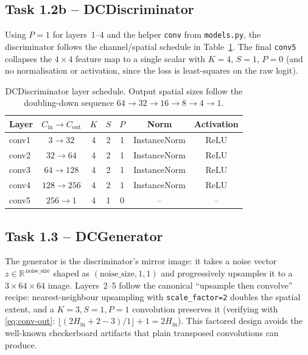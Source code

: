 \documentclass[11pt,a4paper]{article}
\begin{document}
\subsection*{Task 1.2b -- DCDiscriminator}

Using $P=1$ for layers~1--4 and the helper \texttt{conv} from
\texttt{models.py}, the discriminator follows the channel/spatial schedule
in Table~\ref{tab:disc}. The final \texttt{conv5} collapses the
$4{\times}4$ feature map to a single scalar with $K=4,\,S=1,\,P=0$ (and
no normalisation or activation, since the loss is least-squares on the
raw logit).

\begin{table}[h]
    \centering
    \begin{tabular}{lcccccc}
        \toprule
        Layer & $C_{\text{in}}\!\to\!C_{\text{out}}$ & $K$ & $S$ & $P$ & Norm & Activation \\
        \midrule
        conv1 & $3 \to 32$    & 4 & 2 & 1 & InstanceNorm & ReLU \\
        conv2 & $32 \to 64$   & 4 & 2 & 1 & InstanceNorm & ReLU \\
        conv3 & $64 \to 128$  & 4 & 2 & 1 & InstanceNorm & ReLU \\
        conv4 & $128 \to 256$ & 4 & 2 & 1 & InstanceNorm & ReLU \\
        conv5 & $256 \to 1$   & 4 & 1 & 0 & --           & --    \\
        \bottomrule
    \end{tabular}
    \caption{DCDiscriminator layer schedule. Output spatial sizes follow
             the doubling-down sequence $64 \to 32 \to 16 \to 8 \to 4 \to 1$.}
    \label{tab:disc}
\end{table}

\subsection*{Task 1.3 -- DCGenerator}

The generator is the discriminator's mirror image: it takes a noise
vector $z\!\in\!\mathbb{R}^{\,\text{noise\_size}}$ shaped as
$(\text{noise\_size}, 1, 1)$ and progressively upsamples it to a
$3\!\times\!64\!\times\!64$ image. Layers~2--5 follow the canonical
``upsample then convolve'' recipe: nearest-neighbour upsampling with
\verb|scale_factor=2| doubles the spatial extent, and a
$K\!=\!3, S\!=\!1, P\!=\!1$ convolution preserves it (verifying with
\eqref{eq:conv-out}: $\lfloor(2H_{\text{in}}+2-3)/1\rfloor+1 = 2H_{\text{in}}$).
This factored design avoids the well-known checkerboard artifacts that
plain transposed convolutions can produce.
\end{document}
